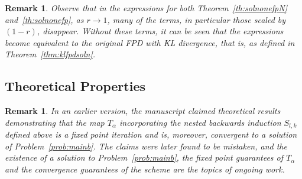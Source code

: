 \documentclass[a4paper,fleqn]{cas-sc}
\newtheorem{remark}[theorem]{Remark}
\begin{document}
\begin{remark}\label{rem:rto1}
    Observe that in the expressions for both Theorem~\ref{th:solnonefpN} and~\ref{th:solnonefp}, as $r \to 1$, many of the terms, in particular those scaled by $(1-r)$, disappear. Without these terms, it can be seen that the expressions become equivalent to the original FPD with KL divergence, that is, as defined in Theorem~\ref{thm:klfpdsoln}.
\end{remark}

\subsection{Theoretical Properties}\label{sec:convergence}
\begin{remark} In an earlier version, the manuscript claimed theoretical results demonstrating that the map $T_{\alpha}$ incorporating the nested backwards induction $S_{l,k}$ defined above is a fixed point iteration and is, moreover, convergent to a solution of Problem~\ref{prob:mainb}. The claims were later found to be mistaken, and the existence of a solution to Problem~\ref{prob:mainb}, the fixed point guarantees of $T_{\alpha}$ and the convergence guarantees of the scheme are the topics of ongoing work.\end{remark}
\end{document}
